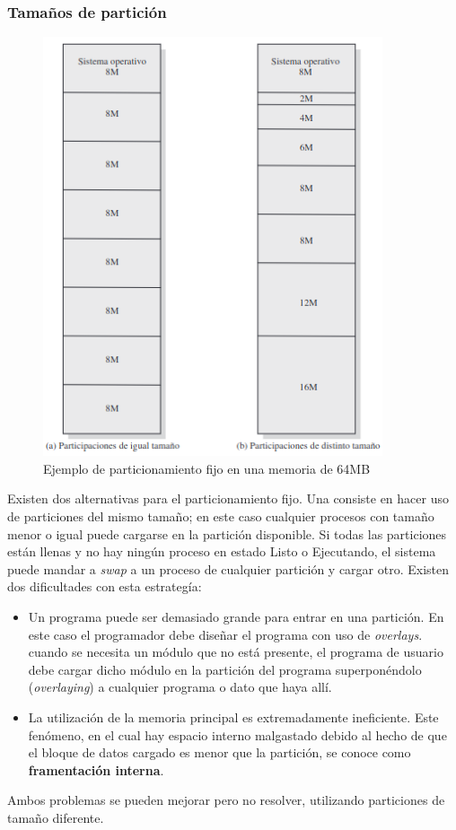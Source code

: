 \documentclass[12pt, a4paper]{article}
\begin{document}
\subsubsection{Tamaños de partición}
\begin{figure}[H]
    \centering
    \includegraphics[width=10cm]{particionfija.png}\par
    \caption{Ejemplo de particionamiento fijo en una memoria de 64MB}
\end{figure}
Existen dos alternativas para el particionamiento fijo. Una consiste en hacer uso de particiones del mismo tamaño; en este caso cualquier procesos con tamaño menor o igual puede cargarse en la partición disponible. Si todas las particiones están llenas y no hay ningún proceso en estado Listo o Ejecutando, el sistema puede mandar a \textit{swap} a un proceso de cualquier partición y cargar otro. Existen dos dificultades con esta estrategía:
\begin{itemize}
    \item Un programa puede ser demasiado grande para entrar en una partición. En este caso el programador debe diseñar el programa con uso de \textit{overlays}. cuando se necesita un módulo que no está presente, el programa de usuario debe cargar dicho módulo en la partición del programa superponéndolo (\textit{overlaying}) a cualquier programa o dato que haya allí.
    \item La utilización de la memoria principal es extremadamente ineficiente. Este fenómeno, en el cual hay espacio interno malgastado debido al hecho de que el bloque de datos cargado es menor que la partición, se conoce como \textbf{framentación interna}.
\end{itemize}
Ambos problemas se pueden mejorar pero no resolver, utilizando particiones de tamaño diferente.
\end{document}
